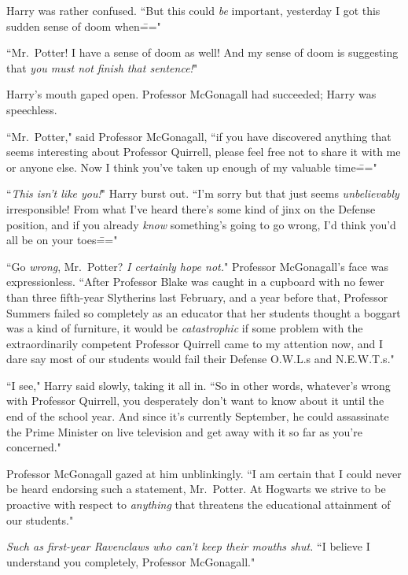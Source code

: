 Harry was rather confused. ``But this could \emph{be} important, yesterday I got this sudden sense of doom when\==="

``Mr.~Potter! I have a sense of doom as well! And my sense of doom is suggesting that \emph{you must not finish that sentence!}"

Harry's mouth gaped open. Professor McGonagall had succeeded; Harry was speechless.

``Mr.~Potter," said Professor McGonagall, ``if you have discovered anything that seems interesting about Professor Quirrell, please feel free not to share it with me or anyone else. Now I think you've taken up enough of my valuable time\==="

``\emph{This isn't like you!}" Harry burst out. ``I'm sorry but that just seems \emph{unbelievably} irresponsible! From what I've heard there's some kind of jinx on the Defense position, and if you already \emph{know} something's going to go wrong, I'd think you'd all be on your toes\==="

``Go \emph{wrong}, Mr.~Potter? \emph{I certainly hope not.}" Professor McGonagall's face was expressionless. ``After Professor Blake was caught in a cupboard with no fewer than three fifth-year Slytherins last February, and a year before that, Professor Summers failed so completely as an educator that her students thought a boggart was a kind of furniture, it would be \emph{catastrophic} if some problem with the extraordinarily competent Professor Quirrell came to my attention now, and I dare say most of our students would fail their Defense O.W.L.s and N.E.W.T.s."

``I see," Harry said slowly, taking it all in. ``So in other words, whatever's wrong with Professor Quirrell, you desperately don't want to know about it until the end of the school year. And since it's currently September, he could assassinate the Prime Minister on live television and get away with it so far as you're concerned."

Professor McGonagall gazed at him unblinkingly. ``I am certain that I could never be heard endorsing such a statement, Mr.~Potter. At Hogwarts we strive to be proactive with respect to \emph{anything} that threatens the educational attainment of our students."

\emph{Such as first-year Ravenclaws who can't keep their mouths shut.} ``I believe I understand you completely, Professor McGonagall."

